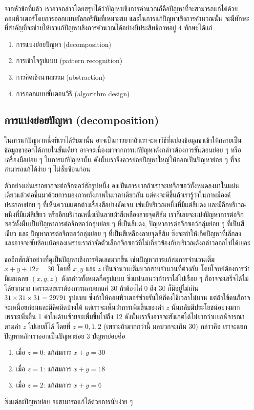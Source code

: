 จากหัวข้อที่แล้ว เราอาจกล่าวโดยสรุปได้ว่าปัญหาเชิงการคำนวณก็คือปัญหาที่จะสามารถแก้ได้ด้วยคอมพิวเตอร์โดยการออกแบบอัลกอริทึมที่เหมาะสม และในการแก้ปัญหาเชิงการคำนวณนั้น จะมีทักษะที่สำคัญที่จะช่วยให้เราแก้ปัญหาเชิงการคำนวณได้อย่างมีประสิทธิภาพอยู่ 4 ทักษะได้แก่
\begin{enumerate}
	\itemsep0em 
	\item การแบ่งย่อยปัญหา (decomposition)
	\item การเข้าใจรูปแบบ (pattern recognition)
	\item การคิดเชิงนามธรรม (abstraction)
	\item การออกแบบขั้นตอนวิธี (algorithm design)
\end{enumerate}

\subsection{การแบ่งย่อยปัญหา (decomposition)}
ในการแก้ปัญหาหนึ่งที่เราได้รับมานั้น อาจเป็นการยากถ้าเราจะหาวิธีที่แปลงข้อมูลขาเข้าให้กลายเป็นข้อมูลขาออกได้ภายในขั้นเดียว อาจจะเนื่องมาจากการแก้ปัญหาดังกล่าวต้องการขั้นตอนย่อย ๆ หรือเครื่องมือย่อย ๆ ในการแก้ปัญหานั้น ดังนั้นเราจึงควรย่อยปัญหาใหญ่ให้ออกเป็นปัญหาย่อย ๆ ที่จะสามารถแก้ได้ง่าย ๆ ไม่ซับซ้อนก่อน

ตัวอย่างเช่นเราอยากจะต่อจิกซอว์สักรูปหนึ่ง คงเป็นการยากถ้าเราจะเทจิกซอว์ทั้งหมดลงมาในแผ่นเดียวแล้วต่อขึ้นมาด้วยการมองภาพทั้งภาพในเวลาเดียวกัน แต่คงจะดีขึ้นถ้าเรารู้ว่าในภาพมีองค์ประกอบย่อย ๆ ที่เห็นความแตกต่างเรื่องสีอย่างชัดเจน เช่นมีบริเวณหนึ่งที่มีแต่สีแดง และมีอีกบริเวณหนึ่งที่มีแต่สีเขียว หรืออีกบริเวณหนึ่งเป็นลายผ้าสีเหลืองลายจุดสีส้ม เราก็เลยจะแบ่งปัญหาการต่อจิกซอว์ทั้งผืนเป็นปัญหาการต่อจิกซอว์กลุ่มย่อย ๆ ที่เป็นสีแดง, ปัญหาการต่อจิกซอว์กลุ่มย่อย ๆ ที่เป็นสีเขียว และ ปัญหาการต่อจิกซอว์กลุ่มย่อย ๆ ที่เป็นสีเหลืองลายจุดสีส้ม ซึ่งจะทำให้เกิดปัญหาที่เล็กลงและอาจจะซับซ้อนน้อยลงเพราะเรากำจัดตัวเลือกจิกซอว์ที่ไม่เกี่ยวข้องกับบริเวณดังกล่าวออกไปได้เยอะ

ขออีกสักตัวอย่างที่ดูเป็นปัญหาเชิงการคิดเลขมากขึ้น เช่นปัญหาการแก้สมการจำนวนเต็ม $x + y + 12z = 30$ โดยที่ $x, y$ และ $z$ เป็นจำนวนเต็มบวกสามจำนวนที่ต่างกัน โดยโจทย์ต้องการว่ามีผลเฉลย $(x,y,z)$ ดังกล่าวทั้งหมดกี่ครูปแบบ ซึ่งแน่นอนว่าถ้าเราไล่ไปเรื่อย ๆ ก็อาจจะเสร็จได้ไม่ได้ยากมาก เพราะเลขเราต้องการผลบอกแค่ 30 ถ้าต้องไล่ 0 ถึง 30 ก็มีอยู่ไม่เกิน $31 \times 31 \times 31 = 29791$ รูปแบบ ซึ่งถ้าให้คอมพิวเตอร์ช่วยรันให้ก็คงใช้เวลาไม่นาน แต่ถ้าใช้คนก็อาจจะเหนื่อยก่อนและมีคิดผิดบ้างได้ แต่เราจะเห็นว่าการเพิ่มขึ้นของค่า $z$ นั้นกลับมีประโยชน์อย่างมาก เพราะเพิ่มขึ้น 1 ค่าในด้านซ้ายจะเพิ่มขึ้นไปถึง 12 ดังนั้นเราจึงอาจจะสังเกตได้ไม่ยากว่าแยกพิจารณาตามค่า $z$ ไปเลยก็ได้ โดยที่ $z = 0,1,2$ (เพราะถ้ามากกว่านี้ ผลบวกจะเกิน 30) กล่าวคือ เราจะแยกปัญหาหลักเราออกเป็นปัญหาย่อย 3 ปํญหาย่อยคือ
\begin{enumerate}
	\itemsep0em 
	\item เมื่อ $z = 0$: แก้สมการ $x + y = 30$
	\item เมื่อ $z = 1$: แก้สมการ $x + y = 18$
	\item เมื่อ $z = 2$: แก้สมการ $x + y = 6$
\end{enumerate}
ซึ่งแต่ละปัญหาย่อย จะสามารถแก้ได้ด้วยการนับง่าย ๆ

